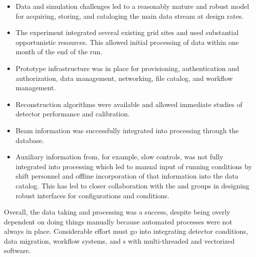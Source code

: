 \begin{itemize}
    \item Data and simulation challenges led to a reasonably mature and robust model for acquiring, storing, and cataloging the main data stream at design rates.
    \item The experiment integrated several existing grid sites and used substantial opportunistic resources.  This allowed initial processing of data within one month of the end of the run.
    \item Prototype infrastructure was in place for provisioning, authentication and authorization, data management, networking, file catalog, and workflow management. 
    \item Reconstruction algorithms were available and allowed immediate studies of detector performance and calibration. 
    \item Beam information was successfully integrated into processing through the  database.
    \item Auxiliary information from, for example, slow controls, was not fully integrated into processing which led to  manual input of running conditions by shift personnel and offline incorporation of that information into the data catalog. This has led to closer collaboration with the  and  groups in designing robust interfaces for configurations and conditions. 
\end{itemize}

Overall, the  data taking and processing was a success, despite being overly dependent on doing things manually because automated processes were not always in place. Considerable effort must go into integrating detector conditions, data migration, workflow systems, and s with multi-threaded and vectorized software.



